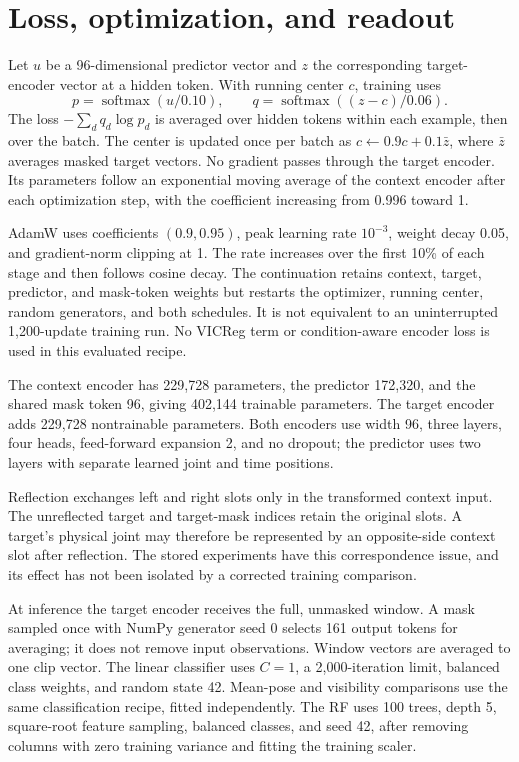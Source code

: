 \documentclass[10pt,twocolumn,letterpaper]{article}
\begin{document}
\section{Loss, optimization, and readout}
Let $u$ be a 96-dimensional predictor vector and $z$ the corresponding target-encoder vector at a hidden token. With running center $c$, training uses
\begin{equation}
p=\operatorname{softmax}(u/0.10),\qquad
q=\operatorname{softmax}((z-c)/0.06).
\end{equation}
The loss $-\sum_d q_d\log p_d$ is averaged over hidden tokens within each example, then over the batch. The center is updated once per batch as $c\leftarrow0.9c+0.1\bar z$, where $\bar z$ averages masked target vectors. No gradient passes through the target encoder. Its parameters follow an exponential moving average of the context encoder after each optimization step, with the coefficient increasing from 0.996 toward 1.

AdamW uses coefficients $(0.9,0.95)$, peak learning rate $10^{-3}$, weight decay 0.05, and gradient-norm clipping at 1. The rate increases over the first 10\% of each stage and then follows cosine decay. The continuation retains context, target, predictor, and mask-token weights but restarts the optimizer, running center, random generators, and both schedules. It is not equivalent to an uninterrupted 1,200-update training run. No VICReg term or condition-aware encoder loss is used in this evaluated recipe.

The context encoder has 229,728 parameters, the predictor 172,320, and the shared mask token 96, giving 402,144 trainable parameters. The target encoder adds 229,728 nontrainable parameters. Both encoders use width 96, three layers, four heads, feed-forward expansion 2, and no dropout; the predictor uses two layers with separate learned joint and time positions.

Reflection exchanges left and right slots only in the transformed context input. The unreflected target and target-mask indices retain the original slots. A target's physical joint may therefore be represented by an opposite-side context slot after reflection. The stored experiments have this correspondence issue, and its effect has not been isolated by a corrected training comparison.

At inference the target encoder receives the full, unmasked window. A mask sampled once with NumPy generator seed 0 selects 161 output tokens for averaging; it does not remove input observations. Window vectors are averaged to one clip vector. The linear classifier uses $C=1$, a 2,000-iteration limit, balanced class weights, and random state 42. Mean-pose and visibility comparisons use the same classification recipe, fitted independently. The RF uses 100 trees, depth 5, square-root feature sampling, balanced classes, and seed 42, after removing columns with zero training variance and fitting the training scaler.
\end{document}
